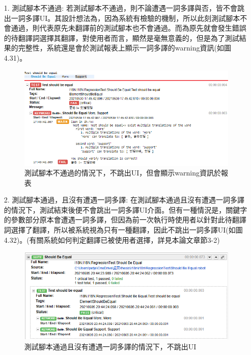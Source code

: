 \begin{itemize}
\item[1.]測試腳本不通過:
若測試腳本不通過，則不論遭遇一詞多譯與否，皆不會跳出一詞多譯UI。其設計想法為，因為系統有檢驗的機制，所以此刻測試腳本不會通過，則代表原先未翻譯前的測試腳本也不會通過。而為原先就會發生錯誤的待翻譯詞選擇其翻譯，對使用者而言，顯然是毫無意義的，但是為了測試結果的完整性，系統還是會於測試報表上顯示一詞多譯的warning資訊(如圖4.31)。
\begin{figure}[H]
\includegraphics[width= \textwidth]{../論文截圖/4-3-6 測試腳本fail，不跳UI.png}
\caption{測試腳本不通過的情況下，不跳出UI，但會顯示warning資訊於報表}
\end{figure}
\item[2.]測試腳本通過，且沒有遭遇一詞多譯: 
在測試腳本通過且沒有遭遇一詞多譯的情況下，測試結束後便不會跳出一詞多譯UI介面。但有一種情況是，關鍵字的參數部分原本會遭遇一詞多譯，但因為前一次執行時使用者以針對此待翻譯詞選擇了翻譯，所以被系統視為只有一種翻譯，因此不跳出一詞多譯UI(如圖4.32)。(有關系統如何判定翻譯已被使用者選擇，詳見本論文章節3-2)
\begin{figure}[H]
\includegraphics[width= \textwidth]{../論文截圖/4-3-7 測試腳本pass且沒一詞多譯，不跳UI.png}
\caption{測試腳本通過且沒有遭遇一詞多譯的情況下，不跳出UI}
\end{figure}
\end{itemize}

